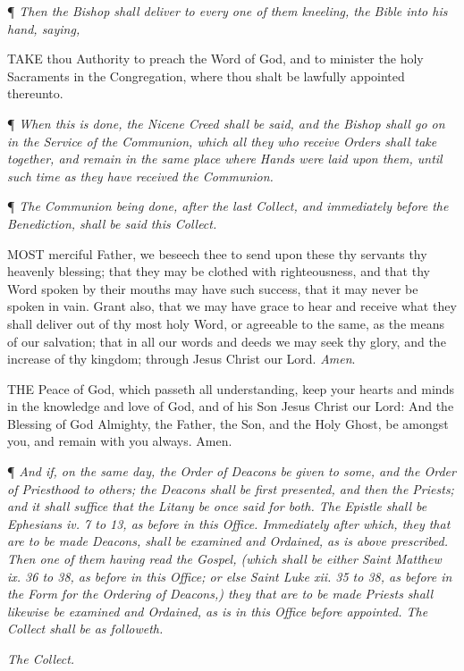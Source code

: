 ¶ \emph{Then the Bishop
shall deliver to every one of them kneeling, the Bible into his hand,
saying,}

TAKE thou Authority to
preach the Word of God, and to minister the holy Sacraments in the Congregation,
where thou shalt be lawfully appointed thereunto.

¶ \emph{When this is
done, the Nicene Creed shall be said, and the Bishop shall go on in the
Service of the Communion, which all they who receive Orders shall take
together, and remain in the same place where Hands were laid upon them,
until such time as they have received the Communion.}

¶ \emph{The Communion
being done, after the last Collect, and immediately before the Benediction,
shall be said this Collect.}

MOST merciful Father,
we beseech thee to send upon these thy servants thy heavenly blessing;
that they may be clothed with righteousness, and that thy Word spoken
by their mouths may have such success, that it may never be spoken in
vain. Grant also, that we may have grace to hear and receive what they
shall deliver out of thy most holy Word, or agreeable to the same, as
the means of our salvation; that in all our words and deeds we may seek
thy glory, and the increase of thy kingdom; through Jesus Christ our Lord.
\emph{Amen}.

THE Peace
of God, which passeth all understanding, keep your hearts and minds in
the knowledge and love of God, and of his Son Jesus Christ our Lord: And
the Blessing of God Almighty, the Father, the Son, and the Holy Ghost,
be amongst you, and remain with you always. Amen.

¶ \emph{And if, on the same day, the Order of Deacons
be given to some, and the Order of Priesthood to others; the Deacons shall
be first presented, and then the Priests; and it shall suffice that the
Litany be once said for both. The Epistle shall be Ephesians iv. 7 to
13, as before in this Office. Immediately after which, they that are to
be made Deacons, shall be examined and Ordained, as is above prescribed.
Then one of them having read the Gospel, (which shall be either Saint
Matthew ix. 36 to 38, as before in this Office; or else Saint Luke xii.
35 to 38, as before in the Form for the Ordering of Deacons,) they that
are to be made Priests shall likewise be examined and Ordained, as is
in this Office before appointed. The Collect shall be as followeth.}

\emph{The Collect.}

